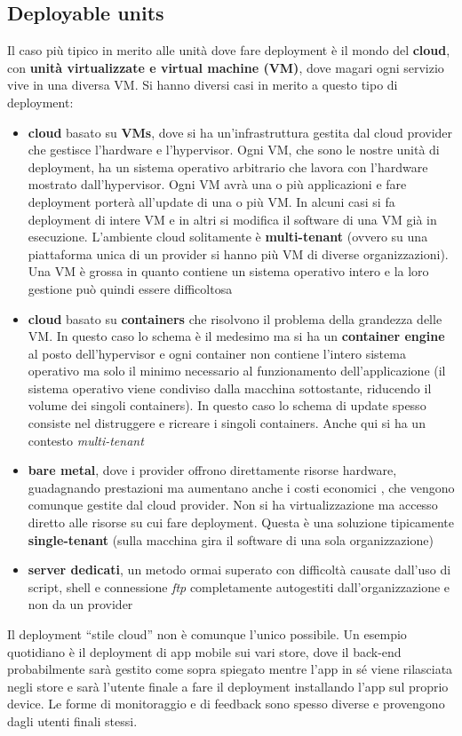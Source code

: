 \documentclass[a4paper,12pt, oneside]{book}
\begin{document}
\subsection{Deployable units}
Il caso più tipico in merito alle unità dove fare deployment è il mondo del
\textbf{cloud}, con \textbf{unità virtualizzate e virtual machine (VM)}, dove
magari ogni servizio vive in una diversa VM. Si hanno diversi casi in merito a
questo tipo di deployment:
\begin{itemize}
  \item \textbf{cloud} basato su \textbf{VMs}, dove si ha un'infrastruttura
  gestita dal cloud provider che gestisce l'hardware e l'hypervisor. Ogni VM,
  che sono le nostre unità di deployment, ha
  un sistema operativo arbitrario che lavora con l'hardware mostrato
  dall'hypervisor. Ogni VM avrà una o più applicazioni e fare deployment porterà
  all'update di una o più VM. In alcuni casi si fa deployment di intere VM e in
  altri si modifica il software di una VM già in esecuzione. L'ambiente cloud
  solitamente è \textbf{multi-tenant} (ovvero su una piattaforma unica di un
  provider si hanno più VM di diverse organizzazioni). Una VM è grossa in quanto
  contiene un sistema operativo intero e la loro gestione può quindi essere
  difficoltosa
  \item \textbf{cloud} basato su \textbf{containers} che risolvono il problema
  della grandezza delle VM. In questo caso lo schema è il medesimo ma si ha un
  \textbf{container engine} al posto dell'hypervisor e ogni container non
  contiene l'intero sistema operativo ma solo il minimo necessario al
  funzionamento dell'applicazione (il sistema operativo viene condiviso dalla
  macchina sottostante, riducendo il volume dei singoli containers). In questo
  caso lo schema di update spesso consiste nel distruggere e ricreare i singoli
  containers. Anche qui si ha un contesto \textit{multi-tenant}
  \item \textbf{bare metal}, dove i provider offrono direttamente risorse
  hardware, guadagnando prestazioni ma aumentano anche i costi economici , che
  vengono comunque gestite dal cloud provider. Non si ha 
  virtualizzazione ma accesso diretto alle risorse su cui fare
  deployment. Questa è una soluzione tipicamente \textbf{single-tenant} (sulla
  macchina gira il software di una sola organizzazione)
  \item \textbf{server dedicati}, un metodo ormai superato con difficoltà
  causate dall'uso di script, shell e connessione \textit{ftp} completamente
  autogestiti dall'organizzazione e non da un provider
\end{itemize}
Il deployment ``stile cloud'' non è comunque l'unico possibile. Un esempio
quotidiano è il deployment di app mobile sui vari store, dove il back-end
probabilmente sarà gestito come sopra spiegato mentre l'app in sé viene
rilasciata negli store e sarà l'utente finale a fare il deployment installando
l'app sul proprio device. Le forme di monitoraggio e di feedback sono spesso
diverse e provengono dagli utenti finali stessi.
\end{document}
